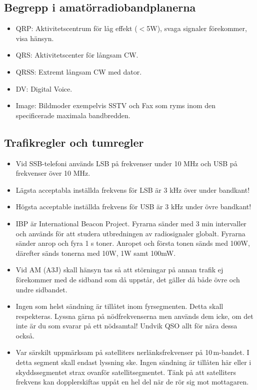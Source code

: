 \subsection{Begrepp i amatörradiobandplanerna}

\begin{itemize}
\item QRP: Aktivitetscentrum för låg effekt ($<$5W), svaga signaler
      förekommer, visa hänsyn.
\item QRS: Aktivitetscenter för långsam CW.
\item QRSS: Extremt långsam CW med dator.
\item DV: Digital Voice.
\item Image: Bildmoder exempelvis SSTV och Fax som ryms inom den specificerade
	  maximala bandbredden.
\end{itemize}

\subsection{Trafikregler och tumregler}

\begin{itemize}
\item Vid SSB-telefoni används LSB på frekvenser under 10 MHz och USB
      på frekvenser över 10 MHz.
\item Lägsta acceptabla inställda frekvens för LSB är 3 kHz över
      under bandkant!
\item Högsta acceptable inställda frekvens för USB är 3 kHz under
      övre bandkant!
\item IBP är International Beacon Project. Fyrarna sänder med 3 min
      intervaller och används för att studera utbredningen av
      radiosignaler globalt. Fyrarna sänder anrop och fyra 1 s toner.
      Anropet och första tonen sänds med 100W, därefter sänds tonerna
      med 10W, 1W samt 100mW.
\item Vid AM (A3J) skall hänsyn tas så att störningar på annan trafik ej fö\-re\-kom\-mer
      med de sidband som då uppstår, det gäller då både övre och undre
      sidbandet.
\item Ingen som helst sändning är tillåtet inom fyrsegmenten. Detta skall respekteras.
      Lyssna gärna på nödfrekvenserna men används dem icke, om det
      inte är du som svarar på ett nödsamtal! Undvik QSO allt för nära
      dessa också.
\item Var särskilt uppmärksam på satelliters nerlänksfrekvenser på 10\,m-bandet.
      I detta segment skall endast lyssning ske. Ingen sändning är
      tillåten här eller i skyddssegmentet strax ovanför
      satellitsegmentet. Tänk på att satelliters frekvens kan
      dopplerskiftas uppåt en hel del när de rör sig mot mottagaren.
\end{itemize}





